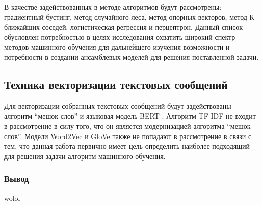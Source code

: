 В качестве задействованных в методе алгоритмов будут рассмотрены: градиентный бустинг, метод случайного леса, метод опорных векторов, метод К-ближайших соседей, логистическая регрессия и перцептрон. Данный список обусловлен потребностью в целях исследования охватить широкий спектр методов машинного обучения для дальнейшего изучения возможности и потребности в создании ансамблевых моделей для решения поставленной задачи.

\subsection{Техника векторизации текстовых сообщений}

Для векторизации собранных текстовых сообщений будут задействованы алгоритм ``мешок слов'' и языковая модель BERT \cite{bert}. Алгоритм TF-IDF не входит в рассмотрение в силу того, что он является модернизацией алгоритма ``мешок слов''. Модели Word2Vec \cite{word2vec} и GloVe \cite{glove} также не попадают в рассмотрение в связи с тем, что данная работа первично имеет цель определить наиболее подходящий для решения задачи алгоритм машинного обучения.

\subsubsection*{Вывод}

wolol

\pagebreak